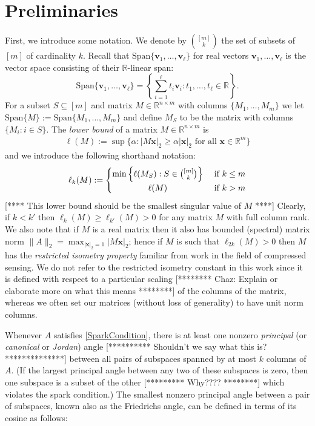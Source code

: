 \documentclass[journal, onecolumn]{IEEEtran}
\begin{document}
\section{Preliminaries}\label{Preliminaries}
 First, we introduce some notation. We denote by ${[m] \choose k}$ the set of subsets of $[m]$ of cardinality $k$. Recall that $\text{Span}\{\mathbf{v}_1, \ldots, \mathbf{v}_\ell\}$ for real vectors $\mathbf{v}_1, \ldots, \mathbf{v}_\ell$ is the vector space consisting of their $\mathbb{R}$-linear span:
%
\[ \text{Span}\{\mathbf{v}_1, \ldots, \mathbf{v}_\ell\} = \left\{ \sum_{i=1}^\ell t_i\mathbf{v}_i : t_1, \ldots, t_\ell \in \mathbb{R}\right\}. \]
%
For a subset $S \subseteq [m]$ and matrix $M \in \mathbb{R}^{n \times m}$ with columns $\{M_1,\ldots,M_m\}$ we let $\text{Span}\{M\} := \text{Span}\{M_1, \ldots, M_m\}$ and define $M_S$ to be the matrix with columns $\{M_i: i \in S\}$. The \emph{lower bound} of a matrix $M \in \mathbb{R}^{n \times m}$ \cite{REF} is 
\begin{align*}
\ell(M) := \sup \{ \alpha : |M\mathbf{x}|_2 \geq \alpha|\mathbf{x}|_2 \text{ for all } \mathbf{x} \in \mathbb{R}^m\}
\end{align*}
%
and we introduce the following shorthand notation:
\[
 \ell_k(M) :=
  \begin{cases} 
      \hfill \min \left\{ \ell(M_S) : S \in {[m] \choose k} \right\} \hfill & \text{ if $k \leq m$} \\
      \hfill \ell(M) \hfill & \text{ if $k > m$} \\
  \end{cases}
\]
[**** This lower bound should be the smallest singular value of $M$ ****]
Clearly, if $k < k'$ then $\ell_{k}(M) \geq \ell_{k'}(M) > 0$ for any matrix $M$ with full column rank. We also note that if $M$ is a real matrix then it also has bounded (spectral) matrix norm $\|A\|_2 = \max_{|\mathbf{x}|_2 = 1}|M\mathbf{x}|_2$; hence if $M$ is such that $\ell_{2k}(M) > 0$ then $M$ has the \emph{restricted isometry property} \cite{CandesTao05} familiar from work in the field of compressed sensing. We do not refer to the restricted isometry constant in this work since it is defined with respect to a particular scaling [******** Chaz:  Explain or elaborate more on what this means ********] of the columns of the matrix, whereas we often set our matrices (without loss of generality) to have unit norm columns.

Whenever $A$ satisfies \eqref{SparkCondition}, there is at least one nonzero \textit{principal} (or \textit{canonical} or \textit{Jordan}) angle [********** Shouldn't we say what this is? **************] between all pairs of subspaces spanned by at most $k$ columns of $A$. (If the largest principal angle between any two of these subspaces is zero, then one subspace is a subset of the other [*********  Why???? ********] which violates the spark condition.) The smallest nonzero principal angle between a pair of subspaces, known also as the Friedrichs angle, can be defined in terms of its cosine as follows:
\end{document}
